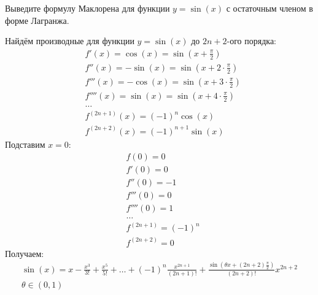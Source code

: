 \begin{question}
    Выведите формулу Маклорена для функции $y = \sin(x)$ с остаточным членом в форме Лагранжа.
\end{question}
\begin{answer}
    Найдём производные для функции $y = \sin(x)$ до $2n+2$-ого порядка:
    \begin{align*}
        &f'(x) = \cos(x) = \sin(x + \frac{\pi}{2}) \\
        &f''(x) = -\sin(x) = \sin(x + 2 \cdot \frac{\pi}{2}) \\
        &f'''(x) = -\cos(x) = \sin(x + 3 \cdot \frac{\pi}{2}) \\
        &f''''(x) = \sin(x) = \sin(x + 4 \cdot \frac{\pi}{2}) \\
        &\ldots \\
        &f ^{(2n+1)}(x) = (-1) ^{n} \cos(x) \\
        &f ^{(2n+2)}(x) = (-1) ^{n+1} \sin(x)
    \end{align*}
    Подставим $x = 0$:
    \begin{align*}
        &f(0) = 0 \\
        &f'(0) = 0 \\
        &f''(0) = -1 \\
        &f'''(0) = 0 \\
        &f''''(0) = 1 \\
        &\ldots \\
        &f ^{(2n+1)} = (-1)^{n} \\
        &f ^{(2n+2)} = 0
    \end{align*}
    Получаем:
    \begin{gather*}
        \sin(x) = x - \frac{x^3}{3!} + \frac{x^5}{5!} + \ldots + (-1)^{n} \frac{x ^{2n+1}}{(2n+1)!} + \frac{\sin\left(\theta x + (2n+2) \frac{\pi}{2}\right)}{(2n+2)!} x ^{2n+2} \\
        \theta \in (0, 1)
    \end{gather*}
\end{answer}
\pagebreak



